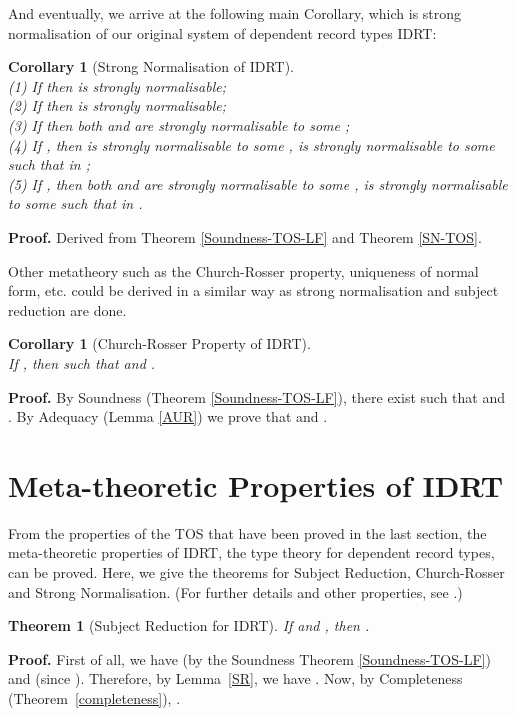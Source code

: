 \documentclass[submission,copyright,creativecommons]{eptcs}
\newcommand{\selfcomment}[1]{\ifodd 0 {\sf #1 }\fi}
\newcommand{\selfc}{\selfcomment}
\newtheorem{thm}[definition]{Theorem}
\newtheorem{corollary}[definition]{Corollary}
\begin{document}
\selfc{
\par{And eventually, we arrive at the following main Corollary, which is strong normalisation of our original system of dependent record types IDRT: }

\begin{corollary}[Strong Normalisation of IDRT] \label{SN-LFDRT}
\ \\
(1) If  then  is strongly normalisable; \\
(2) If  then  is strongly normalisable; \\
(3) If  then both  and  are strongly normalisable to some ; \\
(4) If , then  is strongly normalisable to some ,  is strongly normalisable to some  such that  in ; \\
(5) If , then both  and  are strongly normalisable to some ,  is strongly normalisable to some  such that  in .
\end{corollary}
\textbf{Proof.} Derived from Theorem \ref{Soundness-TOS-LF}
and Theorem \ref{SN-TOS}.  \\


\par{\noindent Other metatheory such as the Church-Rosser property, uniqueness of normal form, etc. could be derived in a similar way as strong normalisation and subject reduction are done. }

\begin{corollary}[Church-Rosser Property of IDRT] \label{CR-LFDRT}
\ \\
If , then  such that  and .
\end{corollary}
\textbf{Proof.} By Soundness (Theorem \ref{Soundness-TOS-LF}), there exist  such that  and . By Adequacy (Lemma \ref{AUR}) we prove that  and . \\
}

\section{Meta-theoretic Properties of IDRT}
\label{sec:metaDRT}

From the properties of the TOS that have been proved in the last section, the meta-theoretic properties of IDRT, the type theory for dependent record types, can be proved.  Here, we give the theorems for Subject Reduction, Church-Rosser and Strong Normalisation.  (For further details and other properties, see \cite{Fen10}.)

\begin{thm}[Subject Reduction for IDRT] \label{SR-LFDRT}
If  and , then .
\end{thm}
\textbf{Proof.} First of all, we have  (by the Soundness Theorem \ref{Soundness-TOS-LF}) and  (since ).  Therefore, by Lemma~\ref{SR}, we have .  Now, by Completeness (Theorem~\ref{completeness}), .
\end{document}
